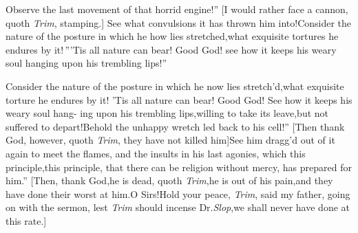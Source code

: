 \documentclass{article}
\begin{document}
\lqq Observe the last movement of that\break
\lqq horrid engine!” [I would rather face\break
a cannon, quoth \textit{Trim}, stamping.]\tsh\break
\lqq See what convulsions it has thrown\break
\lqq him into!\tsh Consider the nature of\break
\lqq the posture in which he how lies\break
\lqq stretched,\tsk what exquisite tortures he\break
\lqq endures by it!\,”\tsh [I hope ’tis not in\catch{\textit{Portugal}.]}
\textit{Portugal.}]\tsk \lqq ’Tis all nature can bear!\break
\lqq Good God! see how it keeps his weary\break
\lqq soul hanging upon his trembling lips!”

\lqq \tsk Consider the nature of the posture\break
\lqq in which he now lies stretch’d,\tsk what\break
\lqq exquisite torture he endures by it!\tsk\break
\lqq ’Tis all nature can bear! Good God!\break
\lqq See how it keeps his weary soul hang-\break
\lqq ing upon his trembling lips,\tsk willing\break
\lqq to take its leave,\tsh but not suffered\break
\lqq to depart!\tsk Behold the unhappy\break
\lqq wretch led back to his cell!” [Then\break
thank God, however, quoth \textit{Trim}, they\break
have not killed him]\tsk\lqq See him dragg’d\break
\lqq out of it again to meet the flames, and\break
\lqq the insults in his last agonies, which\break
\lqq this principle,\tsh this principle, that\break
\lqq there can be religion without mercy,\break
\lqq has prepared for him.” [Then, thank\break
God,\tsk he is dead, quoth \textit{Trim},\tsk he is
out of his pain,\tsk and they have
done their worst at him.\tsk O Sirs!\tsk Hold your peace,
\textit{Trim}, said my father, going on with the sermon, lest
\textit{Trim} should incense Dr.\@ \textit{Slop},\tsk we shall never
have done at this rate.]
\end{document}
